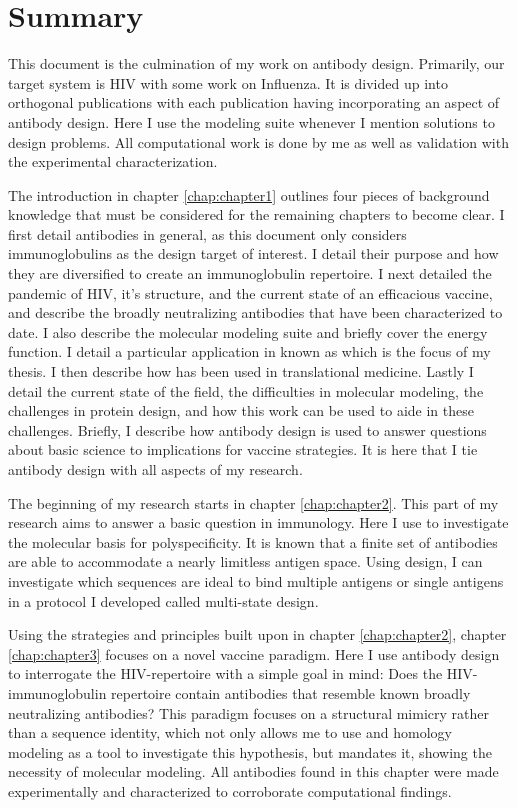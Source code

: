 \chapter*{Summary}
\vspace{7mm}
This document is the culmination of my work on antibody design. Primarily, our target system is HIV with some work on Influenza. It is divided up into orthogonal publications with each publication having incorporating an aspect of antibody design. Here I use the modeling suite \rosetta whenever I mention \silico solutions to design problems. All computational work is done by me as well as validation with the experimental characterization.

The introduction in chapter \ref{chap:chapter1} outlines four pieces of background knowledge that must be considered for the remaining chapters to become clear. I first detail antibodies in general, as this document only considers immunoglobulins as the design target of interest. I detail their purpose and how they are diversified to create an immunoglobulin repertoire. I next detailed the pandemic of HIV, it's structure, and the current state of an efficacious vaccine, and describe the broadly neutralizing antibodies that have been characterized to date. I also describe the molecular modeling suite \rosetta and briefly cover the \rosetta energy function. I detail a particular application in \rosetta known as \rosettadesign which is the focus of my thesis. I then describe how \rosettadesign has been used in translational medicine. Lastly I detail the current state of the field, the difficulties in molecular modeling, the challenges in protein design, and how this work can be used to aide in these challenges. Briefly, I describe how antibody design is used to answer questions about basic science to implications for vaccine strategies. It is here that I tie antibody design with all aspects of my research.

The beginning of my research starts in chapter \ref{chap:chapter2}. This part of my research aims to answer a basic question in immunology. Here I use \rosettadesign to investigate the molecular basis for polyspecificity. It is known that a finite set of antibodies are able to accommodate a nearly limitless antigen space. Using design, I can investigate which sequences are ideal to bind multiple antigens or single antigens in a protocol I developed called multi-state design.

Using the strategies and principles built upon in chapter \ref{chap:chapter2}, chapter \ref{chap:chapter3} focuses on a novel vaccine paradigm. Here I use antibody design to interrogate the HIV-\naive repertoire with a simple goal in mind: Does the HIV-\naive immunoglobulin repertoire contain antibodies that resemble known broadly neutralizing antibodies? This paradigm focuses on a structural mimicry rather than a sequence identity, which not only allows me to use \rosettadesign and homology modeling as a tool to investigate this hypothesis, but mandates it, showing the necessity of molecular modeling. All antibodies found in this chapter were made experimentally and characterized to corroborate computational findings.

